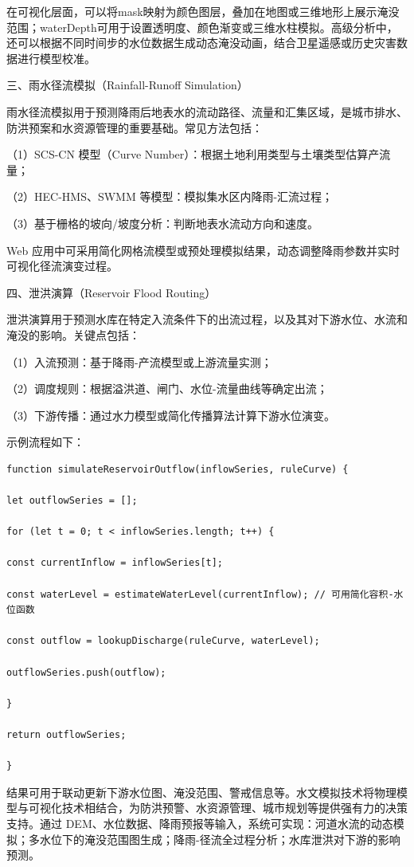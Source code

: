 在可视化层面，可以将mask映射为颜色图层，叠加在地图或三维地形上展示淹没范围；waterDepth可用于设置透明度、颜色渐变或三维水柱模拟。高级分析中，还可以根据不同时间步的水位数据生成动态淹没动画，结合卫星遥感或历史灾害数据进行模型校准。

三、雨水径流模拟（Rainfall-Runoff Simulation）

雨水径流模拟用于预测降雨后地表水的流动路径、流量和汇集区域，是城市排水、防洪预案和水资源管理的重要基础。常见方法包括：

（1）SCS-CN 模型（Curve Number）：根据土地利用类型与土壤类型估算产流量；

（2）HEC-HMS、SWMM 等模型：模拟集水区内降雨-汇流过程；

（3）基于栅格的坡向/坡度分析：判断地表水流动方向和速度。

Web 应用中可采用简化网格流模型或预处理模拟结果，动态调整降雨参数并实时可视化径流演变过程。

四、泄洪演算（Reservoir Flood Routing）

泄洪演算用于预测水库在特定入流条件下的出流过程，以及其对下游水位、水流和淹没的影响。关键点包括：

（1）入流预测：基于降雨-产流模型或上游流量实测；

（2）调度规则：根据溢洪道、闸门、水位-流量曲线等确定出流；

（3）下游传播：通过水力模型或简化传播算法计算下游水位演变。

示例流程如下：

\begin{lstlisting}
function simulateReservoirOutflow(inflowSeries, ruleCurve) {

let outflowSeries = [];

for (let t = 0; t < inflowSeries.length; t++) {

const currentInflow = inflowSeries[t];

const waterLevel = estimateWaterLevel(currentInflow); // 可用简化容积-水位函数

const outflow = lookupDischarge(ruleCurve, waterLevel);

outflowSeries.push(outflow);

}

return outflowSeries;

}
\end{lstlisting}

结果可用于联动更新下游水位图、淹没范围、警戒信息等。水文模拟技术将物理模型与可视化技术相结合，为防洪预警、水资源管理、城市规划等提供强有力的决策支持。通过 DEM、水位数据、降雨预报等输入，系统可实现：河道水流的动态模拟；多水位下的淹没范围图生成；降雨-径流全过程分析；水库泄洪对下游的影响预测。

